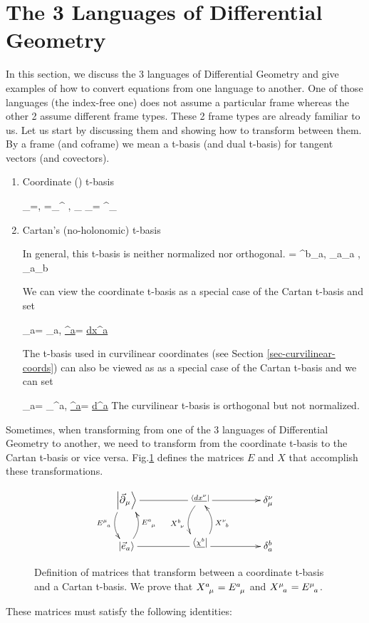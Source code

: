 \section{The 3 Languages of Differential Geometry}
\label{sec-3-lang-diff-geo}

In this section,
we discuss the 3 languages
of Differential Geometry
and give examples of how to convert equations from one language to another.
One of those languages (the index-free one)
does not assume a
particular frame whereas
the other 2 assume
different frame types. 
These 2 frame types are already familiar to us.
Let us start by discussing them
and showing how to transform between them. By a frame (and coframe)
we mean a t-basis  (and dual t-basis) for tangent vectors (and covectors).

\begin{enumerate} 
\item Coordinate  (\Chris) t-basis

\beq
\vecpartial_\mu=, \quad
{}=\delta_\mu^\nu
,\quad
\vecpartial_\mu\cdot
\vecpartial_\nu= \delta^\mu_\nu
\eeq

\item Cartan's (no-holonomic) t-basis

In general, this t-basis is  neither
normalized nor orthogonal.
\beq
{}
= \delta^b_a,
\quad
\vece_a\cdot \vece_a ,\quad
\vece_a\cdot \vece_b  
\eeq

We can view the coordinate 
t-basis as a special case of the
Cartan t-basis
and set

\beq
\vece_a= \vecpartial_a,\quad
\ul{\chi^a}=
\ul{dx^a}
\eeq

The t-basis used in curvilinear coordinates
(see Section \ref{sec-curvilinear-coords})
can also be viewed as as a special case of the Cartan t-basis and we can set

\beq 
\vece_a= \vecpartial_{\phi^a},
\quad 
\ul{\chi^a}=
 \ul{d\phi^a}
\eeq
The curvilinear t-basis is orthogonal but 
not normalized.
\end{enumerate}

Sometimes, when transforming 
from one of the 3 languages
of Differential Geometry to another, we need to
transform from the
coordinate t-basis to the Cartan t-basis or vice versa.
Fig.\ref{fig-ops-between-bases} defines  the matrices $E$ and $X$
that accomplish these transformations.

\begin{figure}[h!]
$$
\xymatrix@C=4pc{
\ket{\vecpartial_\mu}
\ar@{-}[r]
\ar@/_1pc/[d]_{E\indices{^\mu_a}}
&
\stackrel{\bra{\ul{dx^\nu}}}{}
\ar[r]
\ar@/_1pc/[d]_{X\indices{^b_\nu}}
&\delta_\mu^\nu
\\
\ket{\vece_a}
\ar@{-}[r]
\ar@/_1pc/[u]_{E\indices{^a_\mu}}
&\stackrel{\bra{\ul{\chi^b}}}{}
\ar[r]
\ar@/_1pc/[u]_{X\indices{^\nu_b}}
&\delta^b_a
}$$
\caption{Definition
of matrices that transform between a coordinate t-basis and a Cartan t-basis. We prove that $X\indices{^a_\mu}=E\indices{^a_\mu}$ and $X\indices{^\mu_a}=E\indices{^\mu_a}$.}
\label{fig-ops-between-bases}
\end{figure}
These matrices must satisfy the following identities:

